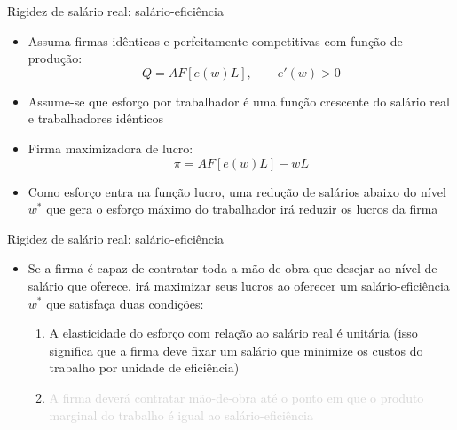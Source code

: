 \documentclass[10pt]{beamer}
\begin{document}
\begin{frame}{Rigidez de salário real: salário-eficiência}
    \begin{itemize}
        \item Assuma firmas idênticas e perfeitamente competitivas com função de produção:
        \begin{equation}
            Q = AF[e(w)L], \qquad e'(w) > 0
        \end{equation}
        \item Assume-se que esforço por trabalhador é uma função crescente do salário real e trabalhadores idênticos\bigskip
        \item Firma maximizadora de lucro:
        \begin{equation}
            \pi = AF[e(w)L] - wL
        \end{equation}
        \item Como esforço entra na função lucro, uma redução de salários abaixo do nível $w^*$ que gera o esforço máximo do trabalhador irá reduzir os lucros da firma\bigskip        
    \end{itemize}
\end{frame}

\begin{frame}{Rigidez de salário real: salário-eficiência}
    \begin{itemize}
        \item Se a firma é capaz de contratar toda a mão-de-obra que desejar ao nível de salário que oferece, irá maximizar seus lucros ao oferecer um salário-eficiência $w^*$ que satisfaça duas condições:\bigskip
        \begin{enumerate}
            \item A elasticidade do esforço com relação ao salário real é unitária (isso significa que a firma deve fixar um salário que minimize os custos do trabalho por unidade de eficiência)\bigskip
            \item \textcolor{lightgray}{A firma deverá contratar mão-de-obra até o ponto em que o produto marginal do trabalho é igual ao salário-eficiência}
        \end{enumerate}
    \end{itemize}
\end{frame}
\end{document}
